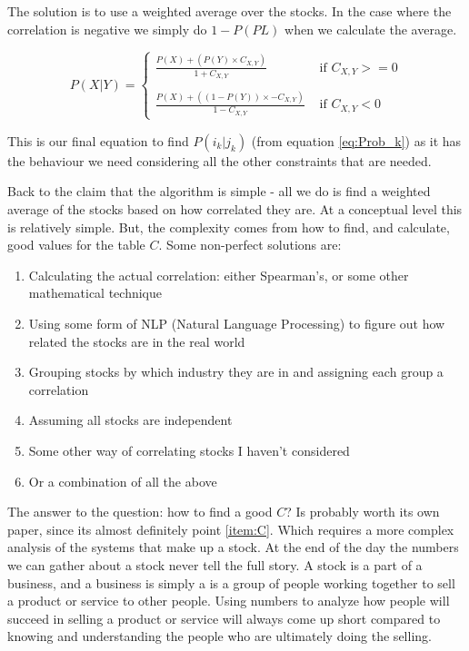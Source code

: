 \documentclass[11pt]{article}
\begin{document}
    The solution is to use a weighted average over the stocks.
    In the case where the correlation is negative we simply do \(1 - P(PL)\)
    when we calculate the average.

    \begin{equation} \label{eq:StockWeight}
        P ( X | Y ) = 
        \begin{cases}
            \displaystyle\frac 
                {P( X ) + (P ( Y ) \times C_{X, Y})}
                {1 + C_{X, Y}} 
                & \text{ if } C_{X, Y} >= 0\\
            \\
            \displaystyle\frac
                {P( X ) + ((1 - P ( Y )) \times - C_{X, Y})}
                {1 - C_{X, Y}} 
                & \text{ if } C_{X, Y} < 0
        \end{cases}
    \end{equation}

    This is our final equation to find \(P(i_k | j_k)\) (from equation \ref{eq:Prob_k})
    as it has the behaviour we need considering all the other constraints that are needed.

    Back to the claim that the algorithm is simple - all we do is find a
    weighted average of the stocks based on how correlated they are. At a conceptual level
    this is relatively simple. But, the complexity comes from how to find, and calculate,
    good values for the table \(C\). Some non-perfect solutions are:

    \begin{enumerate}
        \item{Calculating the actual correlation: either Spearman's, or some other mathematical technique}
        \item{Using some form of NLP (Natural Language Processing) to figure out how related the stocks are in the real world}
        \item{Grouping stocks by which industry they are in and assigning each group a correlation}
        \item{Assuming all stocks are independent}
        \item{Some other way of correlating stocks I haven't considered}
        \item{Or a combination of all the above}\label{item:C}
    \end{enumerate}

    The answer to the question: how to find a good \(C\)? Is probably worth its own paper, since
    its almost definitely point \ref{item:C}. Which requires a more complex analysis of the systems
    that make up a stock. At the end of the day the numbers we can gather about a stock never
    tell the full story. A stock is a part of a business, and a business is simply a is a
    group of people working together to sell a product or service to other people.
    Using numbers to analyze how people will succeed in selling
    a product or service will always come up short compared to knowing and understanding
    the people who are ultimately doing the selling.
\end{document}

